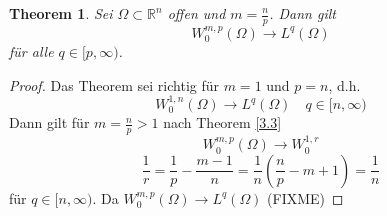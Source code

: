 \documentclass[
paper=a4,
bibtotocnumbered,
liststotocnumbered,
tablecaptionabove,
pointlessnumbers,
twoside,
openright,
10pt
]
{report}
\newtheorem{thm}{Theorem}[chapter]
\theoremstyle{definition}
\numberwithin{equation}{chapter}
\begin{document}
\begin{thm}\label{3.7}
 Sei $\Omega\subset \mathbb R^n$ offen und $m=\frac{n}{p}$. Dann gilt
 \begin{equation}
  W_0^{m,p}(\Omega) \to L^q(\Omega)
 \end{equation}
 für alle $q\in [p,\infty)$.
\end{thm}
\begin{proof}
 Das Theorem sei richtig für $m=1$ und $p=n$, d.h.
 \begin{equation}\label{3.7.1}
  W_0^{1,n}(\Omega) \to L^q(\Omega)\quad q \in [n,\infty)
 \end{equation}
Dann gilt für $m=\frac{n}{p}>1$ nach Theorem \ref{3.3}
\begin{equation}
 W_0^{m,p}(\Omega) \to W_0^{1,r}
\end{equation}
\begin{equation}
 \frac{1}{r} = \frac{1}{p} - \frac{m-1}{n} = \frac{1}{n} \left ( \frac{n}{p} -m+1 \right )= \frac{1}{n}
\end{equation}
für $q\in [n,\infty)$. Da $W_0^{m,p}(\Omega)\to L^q(\Omega)$ (FIXME)


\end{proof}
\end{document}
